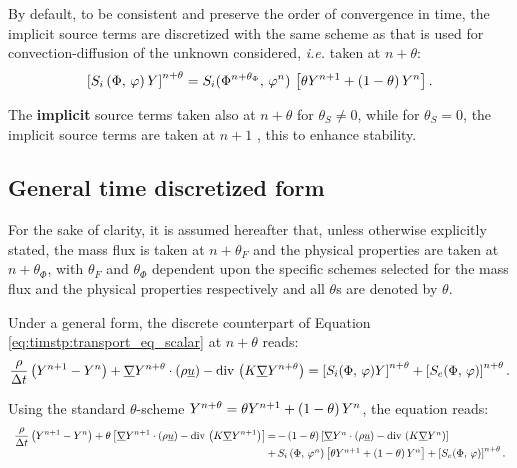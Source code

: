 By default, to be consistent and preserve the order of convergence in time,
the implicit source terms are discretized with the same scheme as that is used
for convection-diffusion of the unknown considered, \emph{i.e.} taken at
$n+\theta $:
\begin{equation}
\left[ S_{i} \left(\Phi , \, \varphi \right) Y \right]^{n+\theta }
= S_{i}(\Phi^{n+\theta _{\Phi}} , \, \varphi^{n}) \,\left[ \theta Y^{n+1}+\left(1-\theta \right)Y^{n} \right].
\end{equation}

\begin{remark}
The \textbf{implicit} source terms taken also at $n+\theta $ for $\theta
_{S}\neq 0$, while for $\theta _{S}=0$, the implicit source terms are taken
at $n+1$ , this to enhance stability.
\end{remark}

\subsection{General time discretized form}

For the sake of clarity, it is assumed hereafter that, unless otherwise
explicitly stated, the mass flux is taken at $n+\theta_F$ and the physical
properties are taken at $n+\theta_\Phi$, with $\theta_F$ and $\theta_\Phi$
dependent upon the specific schemes selected for the mass flux and the
physical properties respectively and all $\theta$s are denoted by $\theta$.

Under a general form, the discrete counterpart of Equation \eqref{eq:timstp:transport_eq_scalar} at
$n+\theta$ reads:
\begin{equation}
\displaystyle \dfrac{\rho}{\Delta t} \left(Y^{n+1}-Y^{n}\right)
+ \underline{\nabla}Y^{n+\theta} \cdot \left(\rho \underline{u} \right)
- \text{div}\, \left( K \underline{\nabla} Y^{n+\theta} \right) =
\left[ S_{i}(\Phi, \, \varphi) Y \right]^{n+\theta} + \left[S_{e}(\Phi, \, \varphi) \right]^{n+\theta} .
\end{equation}

Using the standard $\theta$-scheme $Y^{n+\theta}=\theta Y^{n+1}+\left(1-\theta \right)
Y^{n}$, the equation reads:
\begin{equation}
\begin{array}{r @{\,} c @{\,} l}
\displaystyle \dfrac{\rho}{\Delta t} \left( \varia^{n+1}-\varia^{n} \right)
+ \theta \left[
\grad \varia^{n+1} \cdot \left( \rho \vect{u} \right)
- \dive \left( K \grad \varia^{n+1} \right)   \right]
&=&
- \left(1-\theta\right) \left[
\grad \varia^{n} \cdot \left( \rho \vect{u} \right)
- \dive \left( K \grad \varia^{n}\right)
\right]
 \\
&+& S_{i}\left(\Phi , \,\varphi^n\right)\left[\theta \varia^{n+1}+ \left(1-\theta \right) \varia^{n}\right]
+ \left[ S_{e}(\Phi, \, \varphi)\right]^{n+\theta}.
\end{array}
\end{equation}

